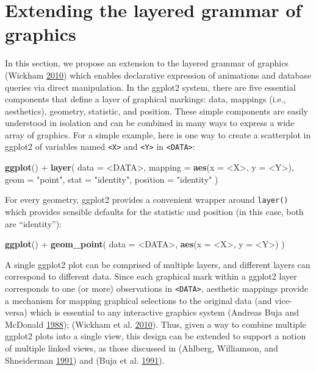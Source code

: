 \documentclass[12pt,]{isuthesis}
\newenvironment{Shaded}{\begin{snugshade}}{\end{snugshade}}
\newcommand{\KeywordTok}[1]{\textcolor[rgb]{0.13,0.29,0.53}{\textbf{{#1}}}}
\newcommand{\DataTypeTok}[1]{\textcolor[rgb]{0.13,0.29,0.53}{{#1}}}
\newcommand{\StringTok}[1]{\textcolor[rgb]{0.31,0.60,0.02}{{#1}}}
\newcommand{\NormalTok}[1]{{#1}}
\begin{document}
\section{Extending the layered grammar of graphics}

In this section, we propose an extension to the layered grammar of
graphics (Wickham \protect\hyperlink{ref-ggplot2-paper}{2010}) which
enables declarative expression of animations and database queries via
direct manipulation. In the ggplot2 system, there are five essential
components that define a layer of graphical markings: data, mappings
(i.e., aesthetics), geometry, statistic, and position. These simple
components are easily understood in isolation and can be combined in
many ways to express a wide array of graphics. For a simple example,
here is one way to create a scatterplot in ggplot2 of variables named
\texttt{<X>} and \texttt{<Y>} in \texttt{<DATA>}:

\begin{Shaded}
\begin{Highlighting}[]
\KeywordTok{ggplot}\NormalTok{() +}\StringTok{ }\KeywordTok{layer}\NormalTok{(}
  \DataTypeTok{data =} \NormalTok{<DATA>, }
  \DataTypeTok{mapping =} \KeywordTok{aes}\NormalTok{(}\DataTypeTok{x =} \NormalTok{<X>, }\DataTypeTok{y =} \NormalTok{<Y>), }
  \DataTypeTok{geom =} \StringTok{"point"}\NormalTok{, }
  \DataTypeTok{stat =} \StringTok{"identity"}\NormalTok{,}
  \DataTypeTok{position =} \StringTok{"identity"}
\NormalTok{)}
\end{Highlighting}
\end{Shaded}

For every geometry, ggplot2 provides a convenient wrapper around
\texttt{layer()} which provides sensible defaults for the statistic and
position (in this case, both are ``identity''):

\begin{Shaded}
\begin{Highlighting}[]
\KeywordTok{ggplot}\NormalTok{() +}\StringTok{ }\KeywordTok{geom_point}\NormalTok{(}
  \DataTypeTok{data =} \NormalTok{<DATA>, }
  \KeywordTok{aes}\NormalTok{(}\DataTypeTok{x =} \NormalTok{<X>, }\DataTypeTok{y =} \NormalTok{<Y>)}
\NormalTok{)}
\end{Highlighting}
\end{Shaded}

A single ggplot2 plot can be comprised of multiple layers, and different
layers can correspond to different data. Since each graphical mark
within a ggplot2 layer corresponds to one (or more) observations in
\texttt{<DATA>}, aesthetic mappings provide a mechanism for mapping
graphical selections to the original data (and vice-versa) which is
essential to any interactive graphics system (Andreas Buja and McDonald
\protect\hyperlink{ref-viewing-pipeline}{1988}); (Wickham et al.
\protect\hyperlink{ref-plumbing}{2010}). Thus, given a way to combine
multiple ggplot2 plots into a single view, this design can be extended
to support a notion of multiple linked views, as those discussed in
(Ahlberg, Williamson, and Shneiderman
\protect\hyperlink{ref-Ahlberg:1991}{1991}) and (Buja et al.
\protect\hyperlink{ref-Buja:1991vh}{1991}).
\end{document}
